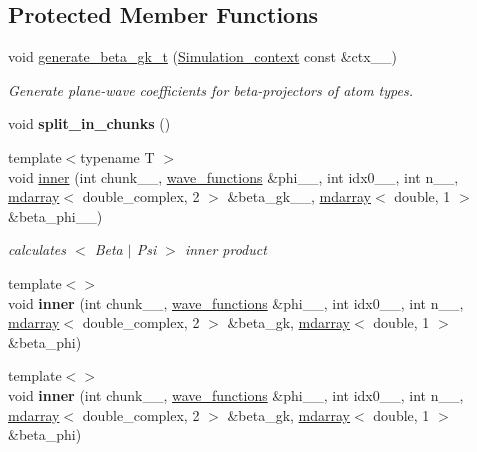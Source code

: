 \subsection*{Protected Member Functions}
\begin{DoxyCompactItemize}
\item 
void \hyperlink{classsirius_1_1_beta__projectors_a93230d7b8932ab6f6b809f7d6cbc6737}{generate\+\_\+beta\+\_\+gk\+\_\+t} (\hyperlink{classsirius_1_1_simulation__context}{Simulation\+\_\+context} const \&ctx\+\_\+\+\_\+)
\begin{DoxyCompactList}\small\item\em Generate plane-\/wave coefficients for beta-\/projectors of atom types. \end{DoxyCompactList}\item 
\hypertarget{classsirius_1_1_beta__projectors_a1adfb42b33853acb7d5e759e49be5a90}{}void {\bfseries split\+\_\+in\+\_\+chunks} ()\label{classsirius_1_1_beta__projectors_a1adfb42b33853acb7d5e759e49be5a90}

\item 
{\footnotesize template$<$typename T $>$ }\\void \hyperlink{classsirius_1_1_beta__projectors_a04266413d357bc006c86d29e13d07676}{inner} (int chunk\+\_\+\+\_\+, \hyperlink{classsddk_1_1wave__functions}{wave\+\_\+functions} \&phi\+\_\+\+\_\+, int idx0\+\_\+\+\_\+, int n\+\_\+\+\_\+, \hyperlink{classsddk_1_1mdarray}{mdarray}$<$ double\+\_\+complex, 2 $>$ \&beta\+\_\+gk\+\_\+\+\_\+, \hyperlink{classsddk_1_1mdarray}{mdarray}$<$ double, 1 $>$ \&beta\+\_\+phi\+\_\+\+\_\+)
\begin{DoxyCompactList}\small\item\em calculates $<$ Beta $\vert$ Psi $>$ inner product \end{DoxyCompactList}\item 
\hypertarget{classsirius_1_1_beta__projectors_ad9be10ec4a5a4dd7b09a80edd43265ea}{}{\footnotesize template$<$$>$ }\\void {\bfseries inner} (int chunk\+\_\+\+\_\+, \hyperlink{classsddk_1_1wave__functions}{wave\+\_\+functions} \&phi\+\_\+\+\_\+, int idx0\+\_\+\+\_\+, int n\+\_\+\+\_\+, \hyperlink{classsddk_1_1mdarray}{mdarray}$<$ double\+\_\+complex, 2 $>$ \&beta\+\_\+gk, \hyperlink{classsddk_1_1mdarray}{mdarray}$<$ double, 1 $>$ \&beta\+\_\+phi)\label{classsirius_1_1_beta__projectors_ad9be10ec4a5a4dd7b09a80edd43265ea}

\item 
\hypertarget{classsirius_1_1_beta__projectors_ad9be10ec4a5a4dd7b09a80edd43265ea}{}{\footnotesize template$<$$>$ }\\void {\bfseries inner} (int chunk\+\_\+\+\_\+, \hyperlink{classsddk_1_1wave__functions}{wave\+\_\+functions} \&phi\+\_\+\+\_\+, int idx0\+\_\+\+\_\+, int n\+\_\+\+\_\+, \hyperlink{classsddk_1_1mdarray}{mdarray}$<$ double\+\_\+complex, 2 $>$ \&beta\+\_\+gk, \hyperlink{classsddk_1_1mdarray}{mdarray}$<$ double, 1 $>$ \&beta\+\_\+phi)\label{classsirius_1_1_beta__projectors_ad9be10ec4a5a4dd7b09a80edd43265ea}

\end{DoxyCompactItemize}
